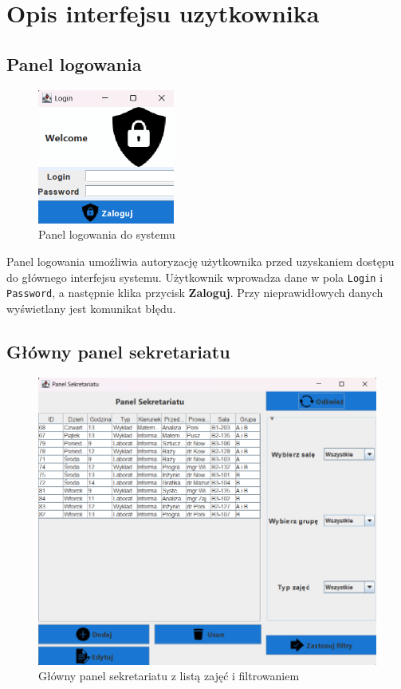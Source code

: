 \chapter{Opis interfejsu uzytkownika}

\section*{Panel logowania}
\begin{figure}[H]
\centering
\includegraphics[width=0.4\textwidth]{figures/workApl/login_panel.png}
\caption{Panel logowania do systemu}
\label{fig:login_panel}
\end{figure}

Panel logowania umożliwia autoryzację użytkownika przed uzyskaniem dostępu do głównego interfejsu systemu. Użytkownik wprowadza dane w pola \texttt{Login} i \texttt{Password}, a następnie klika przycisk \textbf{Zaloguj}. Przy nieprawidłowych danych wyświetlany jest komunikat błędu.

\section*{Główny panel sekretariatu}
\begin{figure}[H]
\centering
\includegraphics[width=\textwidth]{figures/workApl/mainpanel.png}
\caption{Główny panel sekretariatu z listą zajęć i filtrowaniem}
\label{fig:mainpanel}
\end{figure}

